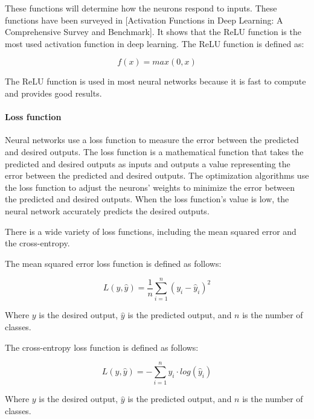 These functions will determine how the neurons respond to inputs. These functions have been surveyed in [Activation Functions in Deep Learning: A Comprehensive Survey and Benchmark]\cite{dubey2022activation}. It shows that the ReLU function is the most used activation function in deep learning. The ReLU function is defined as:

\begin{equation}
    f(x) = max(0, x)
\end{equation}

The ReLU function is used in most neural networks because it is fast to compute and provides good results.


\paragraph{Loss function}

Neural networks use a loss function to measure the error between the predicted and desired outputs. The loss function is a mathematical function that takes the predicted and desired outputs as inputs and outputs a value representing the error between the predicted and desired outputs. The optimization algorithms use the loss function to adjust the neurons' weights to minimize the error between the predicted and desired outputs. When the loss function's value is low, the neural network accurately predicts the desired outputs.


There is a wide variety of loss functions, including the mean squared error and the cross-entropy.

The mean squared error loss function is defined as follows:

\begin{equation}
    L(y, \hat{y}) = \frac{1}{n} \sum_{i=1}^{n} (y_{i} - \hat{y}_{i})^2
\end{equation}

Where $y$ is the desired output, $\hat{y}$ is the predicted output, and $n$ is the number of classes.

The cross-entropy loss function is defined as follows:

\begin{equation}
    L(y, \hat{y}) = - \sum_{i=1}^{n} y_{i} \cdot log(\hat{y}_{i})
\end{equation}

Where $y$ is the desired output, $\hat{y}$ is the predicted output, and $n$ is the number of classes.

